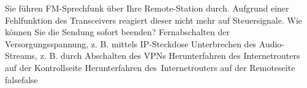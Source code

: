     {Sie führen FM-Sprechfunk über Ihre Remote-Station durch. Aufgrund einer Fehlfunktion des Transceivers reagiert dieser nicht mehr auf Steuersignale. Wie können Sie die Sendung sofort beenden?}
    {Fernabschalten der Versorgungsspannung, z. B. mittels IP-Steckdose}
    {Unterbrechen des Audio-Streams, z. B. durch Abschalten des VPNs}
    {Herunterfahren des Internetrouters auf der Kontrollseite}
    {Herunterfahren des Internetrouters auf der Remoteseite}
    {false}{false}